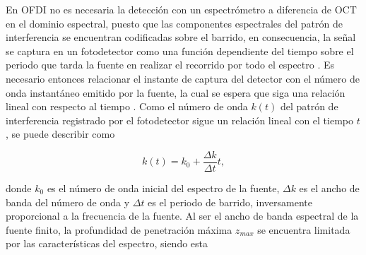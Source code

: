 

En OFDI no es necesaria la detección con un espectrómetro a diferencia de OCT en el dominio espectral, puesto que las componentes espectrales del patrón de interferencia se encuentran codificadas sobre el barrido, en consecuencia, la señal se captura en un fotodetector como una función dependiente del tiempo sobre el periodo que tarda la fuente en realizar el recorrido por todo el espectro \cite{Drexler2015}. Es necesario entonces relacionar el instante de captura del detector con el número de onda instantáneo emitido por la fuente, la cual se espera que siga una relación lineal con respecto al tiempo \cite{Vakoc2005}. Como el número de onda $k(t)$ del patrón de interferencia registrado por el fotodetector sigue un relación lineal con el tiempo $t$, se puede describir como

\begin{equation}
k(t) = k_0 + \frac{\Delta k}{\Delta t} t,
\end{equation}

\noindent donde $k_0$ es el número de onda inicial del espectro de la fuente, $\Delta k$ es el ancho de banda del número de onda y $\Delta t$ es el periodo de barrido, inversamente proporcional a la frecuencia de la fuente. Al ser el ancho de banda espectral de la fuente finito, la profundidad de penetración máxima $z_{max}$ se encuentra limitada por las características del espectro, siendo esta

